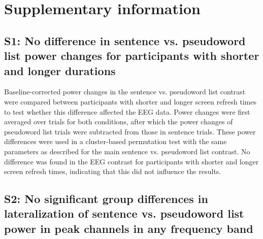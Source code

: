 \newpage

\section{Supplementary information}

\subsection{S1: No difference in sentence vs. pseudoword list power changes for participants with shorter and longer durations} \label{suppl-note}
Baseline-corrected power changes in the sentence vs. pseudoword list contrast were compared between participants with shorter and longer screen refresh times to test whether this difference affected the EEG data. Power changes were first averaged over trials for both conditions, after which the power changes of pseudoword list trials were subtracted from those in sentence trials. These power differences were used in a cluster-based permutation test with the same parameters as described for the main sentence vs. pseudoword list contrast. No difference was found in the EEG contrast for participants with shorter and longer screen refresh times, indicating that this did not influence the results.

\subsection{S2: No significant group differences in lateralization of sentence vs. pseudoword list power in peak channels in any frequency band}

\vspace{-1cm}

 
